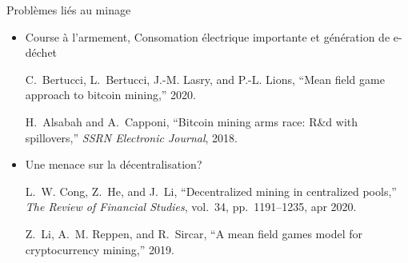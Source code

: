 \documentclass{beamer}
\begin{document}
\begin{frame}{Problèmes liés au minage}
\begin{itemize}
  \item Course à l'armement, Consomation électrique importante et génération de e-déchet
\tiny
\begin{thebibliography}{1}

C.~Bertucci, L.~Bertucci, J.-M. Lasry, and P.-L. Lions, ``Mean field game
  approach to bitcoin mining,'' 2020.

H.~Alsabah and A.~Capponi, ``Bitcoin mining arms race: R{\&}d with
  spillovers,'' {\em {SSRN} Electronic Journal}, 2018.

\end{thebibliography}
\end{itemize}
\begin{itemize}
  \item \normalsize Une menace sur la décentralisation?
\tiny
\begin{thebibliography}{1}

L.~W. Cong, Z.~He, and J.~Li, ``Decentralized mining in centralized pools,''
  {\em The Review of Financial Studies}, vol.~34, pp.~1191--1235, apr 2020.

Z.~Li, A.~M. Reppen, and R.~Sircar, ``A mean field games model for
  cryptocurrency mining,'' 2019.

\end{thebibliography}
\end{itemize}
\end{frame}
\end{document}
